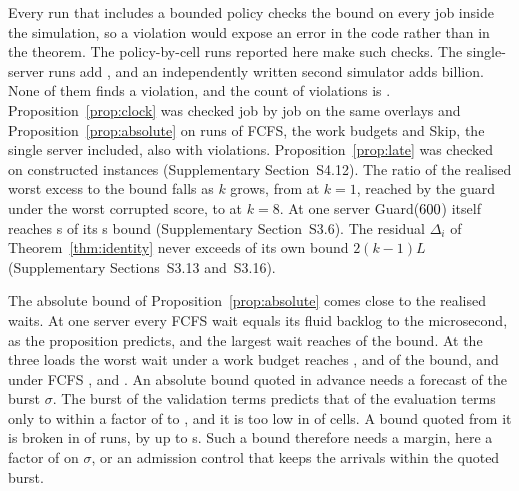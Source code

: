 Every run that includes a bounded policy checks the bound on every job inside the
simulation, so a violation would expose an error in the code rather than in the theorem.
The  policy-by-cell runs reported here make  such
checks. The single-server runs add , and an independently written
second simulator adds  billion. None of them finds a violation, and the count of
violations is . Proposition~\ref{prop:clock} was checked job by job on the same
overlays and Proposition~\ref{prop:absolute} on  runs of FCFS, the work
budgets and Skip, the single server included, also with  violations. Proposition~\ref{prop:late} was checked on constructed instances
(Supplementary Section~S4.12). The ratio of the realised worst excess to the bound falls as
$k$ grows, from  at $k = 1$, reached by the guard under the worst corrupted
score, to  at $k = 8$. At one server Guard($600$) itself reaches  s of its  s bound (Supplementary
Section~S3.6). The residual $\Delta_i$ of Theorem~\ref{thm:identity} never exceeds
 of its own bound $2(k-1)L$ (Supplementary Sections~S3.13 and~S3.16).

The absolute bound of Proposition~\ref{prop:absolute} comes close to the realised waits. At
one server every FCFS wait equals its fluid backlog to the microsecond, as the proposition
predicts, and the largest wait reaches  of the bound. At the three loads the
worst wait under a work budget reaches ,  and  of
the bound, and under FCFS ,  and . An absolute
bound quoted in advance needs a forecast of the burst $\sigma$. The burst of the validation
terms predicts that of the evaluation terms only to within a factor of  to
, and it is too low in  of  cells. A bound quoted from
it is broken in  of  runs, by up to  s. Such a bound
therefore needs a margin, here a factor of  on $\sigma$, or an admission
control that keeps the arrivals within the quoted burst.

